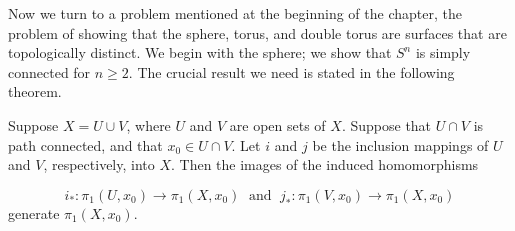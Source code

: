 Now we turn to a problem mentioned at the beginning of the chapter, the problem of showing that the sphere, torus, and double torus are surfaces that are topologically distinct. We begin with the sphere; we show that \(S^{n}\) is simply connected for \(n \geq 2\). The crucial result we need is stated in the following theorem.

\begin{theorem}
\label{thm:\thetheorem}
Suppose \(X = U \cup V\), where \(U\) and \(V\) are open sets of \(X\). Suppose that \(U \cap V\) is path connected, and that \(x_{0} \in U \cap V\). Let \(i\) and \(j\) be the inclusion mappings of \(U\) and \(V\), respectively, into \(X\). Then the images of the induced homomorphisms

\[
i_{ * } : {\pi }_{1}( {U,x_{0}}) \rightarrow {\pi }_{1}( {X,x_{0}}) \;\text{ and }\;j_{ * } : {\pi }_{1}( {V,x_{0}}) \rightarrow {\pi }_{1}( {X,x_{0}})
\]
generate \({\pi }_{1}( {X,x_{0}})\).
\end{theorem}

